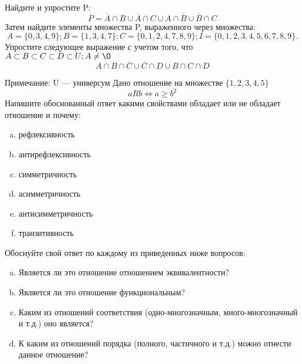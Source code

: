 \documentclass[10pt]{exam}
\begin{document}
\begin{questions}
\question
Найдите и упростите P:
\begin{equation*}
\overline{P} = \overline{A} \cap B \cup \overline{A} \cap C \cup A \cap \overline{B} \cup \overline{B} \cap C
\end{equation*}
Затем найдите элементы множества P, выраженного через множества:
\begin{equation*}
A = \{0, 3, 4, 9\}; 
B = \{1, 3, 4, 7\};
C = \{0, 1, 2, 4, 7, 8, 9\};
I = \{0, 1, 2, 3, 4, 5, 6, 7, 8, 9\}.
\end{equation*}\question
Упростите следующее выражение с учетом того, что $A\subset B \subset C \subset D \subset U; A \neq \O$
\begin{equation*}
A \cap B  \cap \overline{C} \cup \overline{C} \cap D \cup B \cap C \cap D
\end{equation*}

Примечание: U — универсум\question
Дано отношение на множестве $\{1, 2, 3, 4, 5\}$ 
\begin{equation*}
aRb \iff a \geq b^2
\end{equation*}
Напишите обоснованный ответ какими свойствами обладает или не обладает отношение и почему:   
\begin{enumerate} [a)]\setcounter{enumi}{0}
\item рефлексивность
\item антирефлексивность
\item симметричность
\item асимметричность
\item антисимметричность
\item транзитивность
\end{enumerate}

Обоснуйте свой ответ по каждому из приведенных ниже вопросов:
\begin{enumerate} [a)]\setcounter{enumi}{0}
    \item Является ли это отношение отношением эквивалентности?
    \item Является ли это отношение функциональным?
    \item Каким из отношений соответствия (одно-многозначным, много-многозначный и т.д.) оно является?
    \item К каким из отношений порядка (полного, частичного и т.д.) можно отнести данное отношение?
\end{enumerate}



\end{questions}
\end{document}
